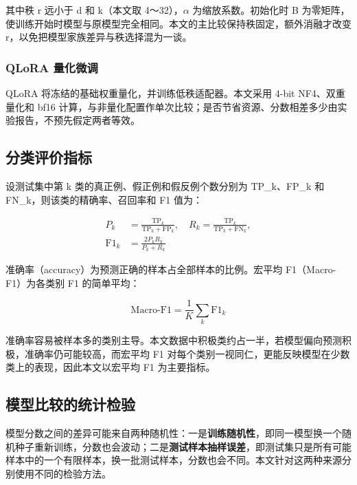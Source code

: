 其中秩 r 远小于 d 和 k（本文取 4～32），\(\alpha\) 为缩放系数。初始化时 B 为零矩阵，使训练开始时模型与原模型完全相同。本文的主比较保持秩固定，额外消融才改变 r，以免把模型家族差异与秩选择混为一谈。

\subsubsection{QLoRA 量化微调}

QLoRA\cite{ref15} 将冻结的基础权重量化，并训练低秩适配器。本文采用 4-bit NF4、双重量化和 bf16 计算，与非量化配置作单次比较；是否节省资源、分数相差多少由实验报告，不预先假定两者等效。

\FloatBarrier\subsection{分类评价指标}

设测试集中第 k 类的真正例、假正例和假反例个数分别为 TP\_k、FP\_k 和 FN\_k，则该类的精确率、召回率和 F1 值为：

\begin{equation}\begin{aligned}P_k&=\frac{\mathrm{TP}_k}{\mathrm{TP}_k+\mathrm{FP}_k},\quad R_k=\frac{\mathrm{TP}_k}{\mathrm{TP}_k+\mathrm{FN}_k},\\ \mathrm{F1}_k&=\frac{2P_kR_k}{P_k+R_k}\end{aligned}\tag{2-7}\label{eq:2-7}\end{equation}

准确率（accuracy）为预测正确的样本占全部样本的比例。宏平均 F1（Macro-F1）为各类别 F1 的简单平均：

\begin{equation}\text{Macro-F1}=\frac1K\sum_k\mathrm{F1}_k\tag{2-8}\label{eq:2-8}\end{equation}

准确率容易被样本多的类别主导。本文数据中积极类约占一半，若模型偏向预测积极，准确率仍可能较高，而宏平均 F1 对每个类别一视同仁，更能反映模型在少数类上的表现，因此本文以宏平均 F1 为主要指标。

\FloatBarrier\subsection{模型比较的统计检验}

模型分数之间的差异可能来自两种随机性：一是\textbf{训练随机性}，即同一模型换一个随机种子重新训练，分数也会波动；二是\textbf{测试样本抽样误差}，即测试集只是所有可能样本中的一个有限样本，换一批测试样本，分数也会不同\cite{ref21}。本文针对这两种来源分别使用不同的检验方法。

